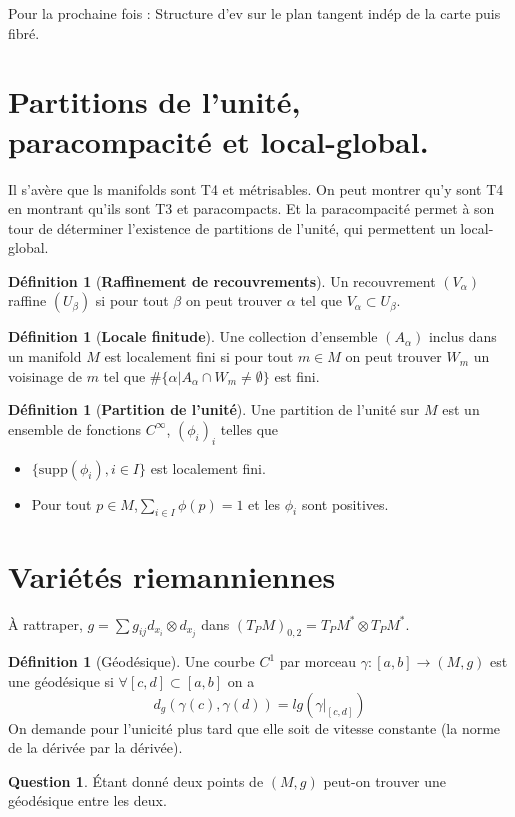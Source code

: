 \documentclass[a4paper,12pt]{book}
\newcommand{\supp}{\textrm{supp}}
\theoremstyle{plain}
\theoremstyle{definition}
\newtheorem{quest}{Question}
\newtheorem{defn}[subsection]{Définition}
\theoremstyle{remark}
\begin{document}
Pour la prochaine fois : Structure d'ev sur le plan tangent indép de la 
carte puis fibré.

\section{Partitions de l'unité, paracompacité et local-global.}
Il s'avère que ls manifolds sont T4 et métrisables. On peut montrer 
qu'y sont T4 en montrant qu'ils sont T3 et paracompacts. Et la 
paracompacité permet à son tour de déterminer l'existence de partitions
de l'unité, qui permettent un local-global.
\begin{defn}[\textbf{Raffinement de recouvrements}]
    Un recouvrement $(V_{\alpha})$ raffine $(U_{\beta})$ si pour tout
    $\beta$ on peut trouver $\alpha$ tel que 
    $V_{\alpha}\subset U_{\beta}$.
\end{defn}
\begin{defn}[\textbf{Locale finitude}]
    Une collection d'ensemble $(A_{\alpha})$ inclus dans un manifold $M$
    est localement fini si pour tout $m\in M$ on peut trouver $W_m$ un
    voisinage de $m$ tel que 
    $\#\{\alpha|A_{\alpha}\cap W_m \ne \emptyset\}$ est fini.
\end{defn}
\begin{defn}[\textbf{Partition de l'unité}]
    Une partition de l'unité sur $M$ est un ensemble de fonctions 
    $C^{\infty}$, $(\phi_i)_i$ telles que
    \begin{itemize}
        \item $\{\supp(\phi_i), i\in I\}$ est localement fini.
        \item Pour tout $p\in M$,$ \sum_{i\in I} \phi(p) = 1$ et les 
            $\phi_i$ sont positives.
    \end{itemize}
\end{defn}

\section{Variétés riemanniennes}
À rattraper, 
$g=\sum g_{ij}d_{x_i}\otimes d_{x_j}$ dans 
$(T_PM)_{0,2}=T_PM^*\otimes T_PM^*$.

\begin{defn}[Géodésique]
    Une courbe $C^1$ par morceau $\gamma\colon [a,b]\to (M,g)$ est
    une géodésique si $\forall [c,d]\subset [a,b]$ on a 
    \[d_g(\gamma(c), \gamma(d))=lg(\gamma|_{[c,d]}) \]
    On demande pour l'unicité plus tard que elle soit de vitesse 
    constante (la norme de la dérivée par la dérivée).
\end{defn}
\begin{quest}
    Étant donné deux points de $(M,g)$ peut-on trouver une géodésique 
    entre les deux.
\end{quest}
\end{document}

